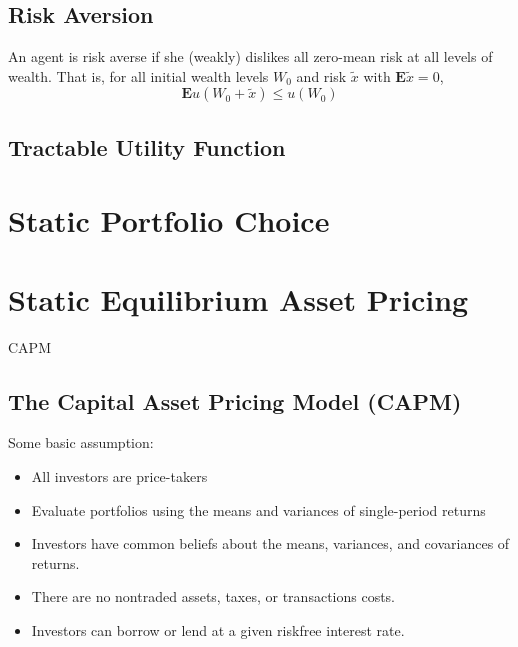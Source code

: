 \documentclass[11pt,green,twocol,citestyle=authoryear, bibstyle=authoryear]{elegantbook}
\begin{document}
\section{Risk Aversion}

\begin{definition}
    An agent is risk averse if she (weakly) dislikes all zero-mean risk at all levels of wealth. That is, for all initial wealth levels $ W_0 $ and risk $ \widetilde{x} $ with $ \mathbf{E}\widetilde{x} = 0 $,
    \begin{equation}
        \mathbf{E} u\left(W_0+\widetilde{x}\right) \leq u\left(W_0\right)
    \end{equation} 
\end{definition}

\section{Tractable Utility Function}

\chapter{Static Portfolio Choice}

\chapter{Static Equilibrium Asset Pricing}

\begin{introduction}
    \item CAPM
\end{introduction}

\section{The Capital Asset Pricing Model (CAPM)}

Some basic assumption:
\begin{itemize}
    \item All investors are price-takers
    \item Evaluate portfolios using the means and variances of single-period returns
    \item Investors have common beliefs about the means, variances, and covariances of returns.
    \item There are no nontraded assets, taxes, or transactions costs.
    \item Investors can borrow or lend at a given riskfree interest rate.
\end{itemize}
\end{document}
